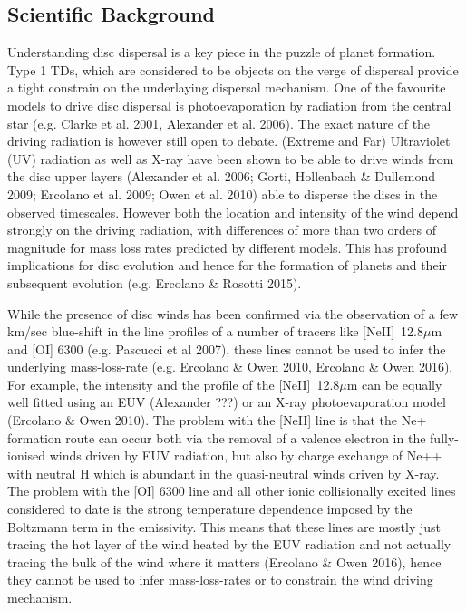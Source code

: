 \documentclass[10pt,fleqn,twoside]{article}
\begin{document}
\subsection{Scientific Background}

Understanding disc dispersal is a key piece in the puzzle of planet
formation. Type 1 TDs, which are considered to be objects on the
verge of dispersal provide a tight constrain on the underlaying
dispersal mechanism. One of the favourite models to drive disc
dispersal is photoevaporation by radiation from the central star
(e.g. Clarke et al. 2001, Alexander et al. 2006). The exact nature of
the driving radiation is however still open to debate.  (Extreme and
Far) Ultraviolet (UV) radiation as well as X-ray have been shown to be
able to drive winds from the disc upper layers (Alexander et al. 2006;
Gorti, Hollenbach \& Dullemond 2009; Ercolano et al. 2009; Owen et
al. 2010) able to disperse the discs in the observed
timescales. However both the location and intensity of the wind depend
strongly on the driving radiation, with differences of more than two
orders of magnitude for mass loss rates predicted by different
models. This has profound implications for disc evolution and hence
for the formation of planets and their subsequent evolution
(e.g. Ercolano \& Rosotti 2015). 

While the presence of disc winds has been confirmed via the
observation of a few km/sec blue-shift in the line profiles of a
number of tracers like [NeII]~12.8$\mu$m and [OI] 6300 (e.g. Pascucci
et al 2007), these lines cannot be used to infer the underlying
mass-loss-rate (e.g. Ercolano \& Owen 2010, Ercolano \& Owen 2016).
 For example, the intensity and the profile of the [NeII]~12.8$\mu$m
 can be equally well fitted using an EUV (Alexander ???) or an X-ray
 photoevaporation model (Ercolano \& Owen 2010). The problem with the
 [NeII] line is that the Ne+ formation route can occur both via the
 removal of a valence electron in the fully-ionised winds driven by
 EUV radiation, but also by charge exchange of Ne++ with neutral H
 which is abundant in the quasi-neutral winds driven by X-ray. 
The problem with the [OI] 6300 line and all other ionic collisionally
excited lines considered to date is the strong temperature dependence
imposed by the Boltzmann term in the emissivity. This means that these
lines are mostly just tracing the hot layer of the wind heated by the
EUV radiation and not actually tracing the bulk of the wind where it
matters (Ercolano \& Owen 2016), hence they
cannot be used to infer mass-loss-rates or to constrain the wind
driving mechanism.   
\end{document}
